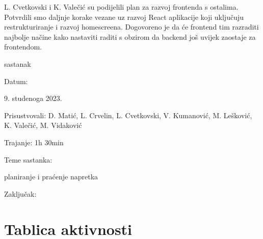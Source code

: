\begin{packed_enum}
\begin{packed_item}
                L. Cvetkovski i K. Valečić su podijelili plan za razvoj frontenda s ostalima. Potvrdili smo daljnje korake
                vezane uz razvoj React aplikacije koji uključuju restrukturiranje i razvoj homescreena. Dogovoreno je da će frontend tim
                razraditi najbolje načine kako nastaviti raditi s obzirom da backend još uvijek zaostaje za frontendom.
               
			\end{packed_item}

			\item  sastanak
			\item[] \begin{packed_item}
				\item Datum: \date[{9. studenoga 2023.}
				\item Prisustvovali: D. Matić, L. Crvelin, L. Cvetkovski, V. Kumanović, M. Lešković, K. Valečić, M. Vidaković
				\item Trajanje: 1h 30min
				\item Teme sastanka: 
				\begin{packed_item}
					\item  planiranje i praćenje napretka
				\end{packed_item}
                \item Zaključak: \\
               
               
			\end{packed_item}
			
		\end{packed_enum}
		
		\eject
		\section*{Tablica aktivnosti}

